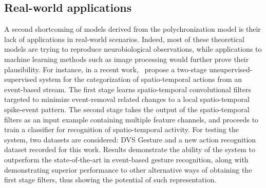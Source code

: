\documentclass[brainsci, %
               review,submit,pdftex,moreauthors
               ]{Definitions/mdpi}
\begin{document}







\subsection{Real-world applications}

A second shortcoming of models derived from the polychronization model is their lack of applications in real-world scenarios. Indeed, most of these theoretical models are trying to reproduce neurobiological observations, while applications to machine learning methods such as image processing would further prove their plausibility. For instance, in a recent work,~\citet{ghosh_spatiotemporal_2019} propose a two-stage unsupervised-supervised system for the categorization of spatio-temporal actions from an event-based stream. The first stage learns spatio-temporal convolutional filters targeted to minimize event-removal related changes to a local spatio-temporal spike-event pattern. The second stage takes the output of the spatio-temporal filters as an input example containing multiple feature channels, and proceeds to train a classifier for recognition of spatio-temporal activity. For testing the system, two datasets are considered: DVS Gesture and a new action recognition dataset recorded for this work. Results demonstrate the ability of the system to outperform the state-of-the-art in event-based gesture recognition, along with demonstrating superior performance to other alternative ways of obtaining the first stage filters, thus showing the potential of such representation. 
\end{document}
